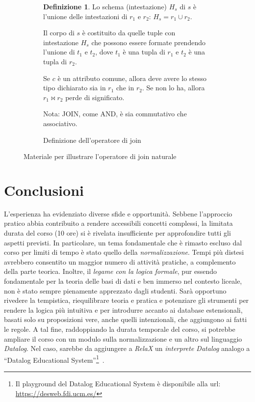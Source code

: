 \documentclass[withtimes]{easychair}
\theoremstyle{definition}
\newtheorem{definition}{Definizione}
\begin{document}
\begin{figure}[htp]
\begin{subfigure}[t]{\textwidth}
\begin{definition}
Lo schema (intestazione) $H_s$ di $s$ è l'unione delle intestazioni di $r_1$ e $r_2$: $H_s = r_1 \cup r_2$.

Il corpo di $s$ è costituito da quelle tuple con intestazione $H_s$ che possono essere formate prendendo l'unione di $t_1$ e $t_2$, dove $t_1$ è una tupla di $r_1$ e $t_2$ è una tupla di $r_2$.

Se $c$ è un attributo comune, allora deve avere lo stesso tipo dichiarato sia in $r_1$ che in $r_2$. Se non lo ha, allora $r_1 \bowtie r_2$ perde di significato.

Nota: JOIN, come AND, è sia commutativo che associativo.
		\end{definition}
		\caption{Definizione dell'operatore di join\label{fig:join-def}}
	\end{subfigure}

      \caption{Materiale per illustrare l'operatore di join naturale}\label{fig:table-join}
\end{figure}

\section{Conclusioni}\label{conclusioni}

L'esperienza ha evidenziato diverse sfide e opportunità. Sebbene l'approccio pratico abbia contribuito a rendere accessibili concetti complessi, la limitata durata del corso (10 ore) si è rivelata insufficiente per approfondire tutti gli aspetti previsti. In particolare, un tema fondamentale che è rimasto escluso dal corso per limiti di tempo è stato quello della \emph{normalizzazione}. Tempi più distesi avrebbero  consentito un maggior numero di attività pratiche, a complemento della parte teorica. Inoltre, il \emph{legame con la logica formale}, pur essendo fondamentale per la teoria delle basi di dati e ben immerso nel contesto liceale, non è stato sempre pienamente apprezzato dagli studenti. Sarà opportuno rivedere la tempistica, riequilibrare teoria e pratica e potenziare gli strumenti per rendere la logica più intuitiva e per introdurre accanto ai database estensionali, basati solo su proposizioni vere, anche quelli intenzionali, che aggiungono ai fatti le regole. A tal fine, raddoppiando la durata temporale del corso, si potrebbe ampliare il corso con un modulo sulla normalizzazione e un altro sul linguaggio \emph{Datalog}. Nel caso, sarebbe da aggiungere a \emph{RelaX} un \emph{interprete Datalog} analogo a ``Datalog Educational System''\footnote{Il playground del Datalog Educational System è disponibile alla url: \url{https://desweb.fdi.ucm.es/}}~\cite{SaenzPerez2011}.

\label{sect:bib}
\printbibliography
\end{document}

